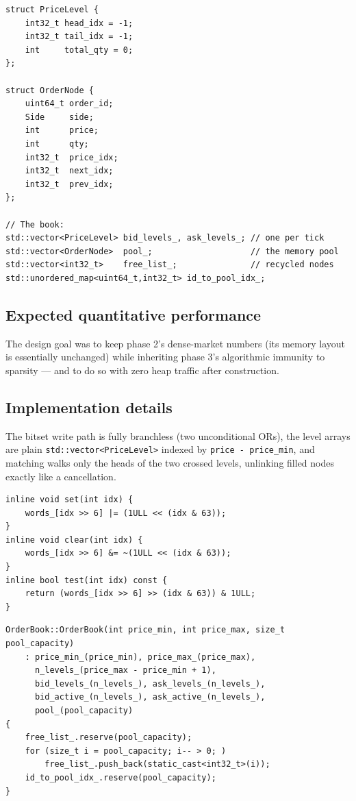 \documentclass[11pt,a4paper]{article}
\begin{document}
\begin{lstlisting}[caption={Intrusive list inside a memory pool (phase 4)}]
struct PriceLevel {
    int32_t head_idx = -1;
    int32_t tail_idx = -1;
    int     total_qty = 0;
};

struct OrderNode {
    uint64_t order_id;
    Side     side;
    int      price;
    int      qty;
    int32_t  price_idx;
    int32_t  next_idx;
    int32_t  prev_idx;
};

// The book:
std::vector<PriceLevel> bid_levels_, ask_levels_; // one per tick
std::vector<OrderNode>  pool_;                    // the memory pool
std::vector<int32_t>    free_list_;               // recycled nodes
std::unordered_map<uint64_t,int32_t> id_to_pool_idx_;
\end{lstlisting}

\subsection{Expected quantitative performance}

The design goal was to keep phase 2's dense-market numbers (its memory
layout is essentially unchanged) while inheriting phase 3's algorithmic
immunity to sparsity --- and to do so with zero heap traffic after
construction.

\subsection{Implementation details}

The bitset write path is fully branchless (two unconditional ORs), the
level arrays are plain \texttt{std::vector<PriceLevel>} indexed by
\texttt{price - price\_min}, and matching walks only the heads of the two
crossed levels, unlinking filled nodes exactly like a cancellation.

\begin{lstlisting}[caption={Hardware-accelerated tick bitset (phase 4)}]
inline void set(int idx) {
    words_[idx >> 6] |= (1ULL << (idx & 63));
}
inline void clear(int idx) {
    words_[idx >> 6] &= ~(1ULL << (idx & 63));
}
inline bool test(int idx) const {
    return (words_[idx >> 6] >> (idx & 63)) & 1ULL;
}
\end{lstlisting}

\begin{lstlisting}[caption={Intrusive list and memory pool initialization
(phase 4)}]
OrderBook::OrderBook(int price_min, int price_max, size_t pool_capacity)
    : price_min_(price_min), price_max_(price_max),
      n_levels_(price_max - price_min + 1),
      bid_levels_(n_levels_), ask_levels_(n_levels_),
      bid_active_(n_levels_), ask_active_(n_levels_),
      pool_(pool_capacity)
{
    free_list_.reserve(pool_capacity);
    for (size_t i = pool_capacity; i-- > 0; )
        free_list_.push_back(static_cast<int32_t>(i));
    id_to_pool_idx_.reserve(pool_capacity);
}
\end{lstlisting}
\end{document}
